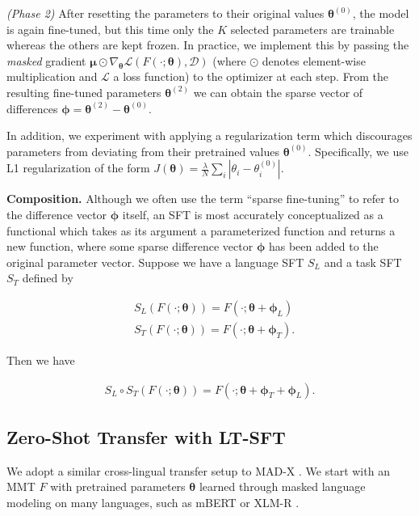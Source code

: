  \textit{(Phase 2)} After resetting the parameters to their original values $\bm{\theta}^{(0)}$, the model is again fine-tuned, but this time only the $K$ selected parameters are trainable whereas the others are kept frozen. In practice, we implement this by passing the \textit{masked} gradient $ \bm{\mu} \odot \nabla_{\bm\theta} \mathcal{L}(F(\cdot;\bm\theta), \mathcal{D})$ (where $\odot$ denotes element-wise multiplication and $\mathcal{L}$ a loss function) to the optimizer at each step. From the resulting fine-tuned parameters $\bm{\theta}^{(2)}$ we can obtain the sparse vector of differences $\bm{\phi} = \bm{\theta}^{(2)} - \bm{\theta}^{(0)}$.

In addition, we experiment with applying a regularization term which discourages parameters from deviating from their pretrained values $\bm{\theta}^{(0)}$. Specifically, we use L1 regularization of the form $J(\bm{\theta}) = \frac{\lambda}{N} \sum_i |\theta_i - \theta_i^{(0)}|$. 

 \textbf{Composition.} 
Although we often use the term ``sparse fine-tuning'' to refer to the difference vector $\bm{\phi}$ itself, an SFT is most accurately conceptualized as a functional which takes as its argument a parameterized function and returns a new function, where some sparse difference vector $\bm{\phi}$ has been added to the original parameter vector. Suppose we have a language SFT $S_L$ and a task SFT $S_T$ defined by

\begin{align*}
    &S_L(F(\cdot ; \bm{\theta})) = F(\cdot ; \bm{\theta} + \bm{\phi}_L) \\
    &S_T(F(\cdot ; \bm{\theta})) = F(\cdot ; \bm{\theta} + \bm{\phi}_T).
\end{align*}

Then we have

\begin{align*}
    S_L \circ S_T(F(\cdot ; \bm{\theta})) = F(\cdot ; \bm{\theta} + \bm{\phi}_T + \bm{\phi}_L).
\end{align*}

\subsection{Zero-Shot Transfer with LT-SFT} \label{sec:sft-zs-xlt}
We adopt a similar cross-lingual transfer setup to MAD-X \cite[see also \S\ref{sec:background}]{pfeiffer-etal-2020-mad}. We start with an MMT $F$ with pretrained parameters $\bm{\theta}$ learned through masked language modeling on many languages, such as mBERT \citep{devlin-etal-2019-bert} or XLM-R \citep{conneau-etal-2020-unsupervised}.

